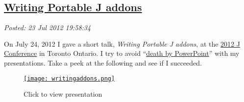 %

\subsection*{\href{http://bakerjd99.wordpress.com/2012/07/23/writing-portable-j-addons/}{Writing Portable J addons}}


\noindent\emph{Posted: 23 Jul 2012 19:58:34}
\vspace{6pt}

On July 24, 2012 I gave a short talk, \emph{Writing Portable J addons},
at the
\href{http://www.jsoftware.com/jwiki/Community/Conference2012}{2012 J
Conference} in Toronto Ontario. I try to avoid
``\href{http://www.slideshare.net/thecroaker/death-by-powerpoint}{death
by PowerPoint}'' with my presentations. Take a peek at the following and
see if I succeeded.



\captionsetup[figure]{labelformat=empty}
\begin{figure}[htbp]
\centering
\href{https://docs.google.com/presentation/d/1M2uJ2FcWpZDlMNBnz7tL0KVJoSMfkweTXLl39ldEr_E/edit#slide=id.p16}{\texttt{[image: writingaddons.png]}}
\caption{Click to view presentation}
\label{fig:3059X0}
\end{figure}



%